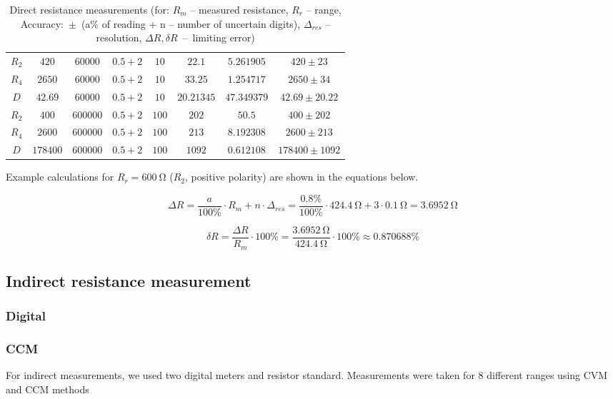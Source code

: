 \begin{table}[H]
\begin{tabular}{|  c | c | c | c | c | c | c | c |}
		\hline
		$R_2$ & $420$ & $60000$ & $0.5+2$ & $10$ & $22.1$ & $5.261905$ & $420 \pm 23$ \\
		$R_4$ & $2650$ & $60000$ & $0.5+2$ & $10$ & $33.25$ & $1.254717$ & $2650 \pm 34$ \\
		$D$ & $42.69$ & $60000$ & $0.5+2$ & $10$ & $20.21345$ & $47.349379$ & $42.69 \pm 20.22$ \\
		\hline
		$R_2$ & $400$ & $600000$ & $0.5+2$ & $100$ & $202$ & $50.5$ & $400 \pm 202$ \\
		$R_4$ & $2600$ & $600000$ & $0.5+2$ & $100$ & $213$ & $8.192308$ & $2600 \pm 213$ \\
		$D$ & $178400$ & $600000$ & $0.5+2$ & $100$ & $1092$ & $0.612108$ & $178400 \pm 1092$ \\
		\hline
	\end{tabular}
	\caption{Direct resistance measurements (for: $R_m$ -- measured resistance, $R_r$ -- range, Accuracy:~$\pm$~(a$\unit{\percent}$ of reading + n  -- number of uncertain digits), $\Delta_{res}$ -- resolution, $\Delta R, \delta R$~--~limiting error)}
	\label{tab:direct}
\end{table}

Example calculations for $R_r = \SI{600}{\ohm}$ ($R_2$, positive polarity) are shown in the equations below.

\begin{equation}
	\Delta R = \frac{a}{100\unit{\percent}}\cdot R_m + n\cdot \Delta_{res} = \frac{0.8\unit{\percent}}{100\unit{\percent}}\cdot\SI{424.4}{\ohm} + 3\cdot\SI{0.1}{\ohm} = \SI{3.6952}{\ohm}
\end{equation}

\begin{equation}
	\delta R = \frac{\Delta R}{R_m}\cdot 100\unit{\percent} = \frac{\SI{3.6952}{\ohm}}{\SI{424.4}{\ohm}}\cdot 100\unit{\percent}\approx 0.870688\unit{\percent}
\end{equation}

\subsection{Indirect resistance measurement}


\subsubsection{Digital}
\subsubsection*{CCM}
For indirect measurements, we used two digital meters and resistor standard. Measurements were taken for 8 different ranges using CVM and CCM methods 

